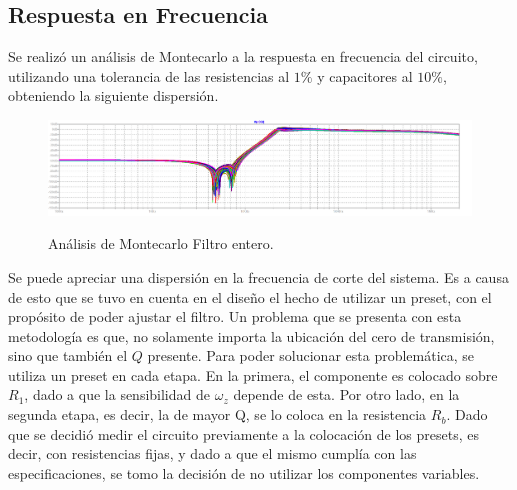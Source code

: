 \subsection{Respuesta en Frecuencia}
Se realizó un análisis de Montecarlo a la respuesta en frecuencia del circuito, utilizando una tolerancia de las resistencias al $1\%$ y capacitores al $10\%$, obteniendo la siguiente dispersión.
\begin{figure}[H]
	\centering
	\includegraphics[width=\textwidth]{Imagenes-Ej3/mcsedra.png}
	\label{fig:mcsedra}
	\caption{Análisis de Montecarlo Filtro entero.}
\end{figure}
Se puede apreciar una dispersión en la frecuencia de corte del sistema. Es a causa de esto que se tuvo en cuenta en el diseño el hecho de utilizar un preset, con el propósito de poder ajustar el filtro. Un problema que se presenta con esta metodología es que, no solamente importa la ubicación del cero de transmisión, sino que también el $Q$ presente. Para poder solucionar esta problemática, se utiliza un preset en cada etapa. En la primera, el componente es colocado sobre $R_1$, dado a que la sensibilidad de $\omega_z$ depende de esta. Por otro lado, en la segunda etapa, es decir, la de mayor Q, se lo coloca en la resistencia $R_b$. Dado que se decidió medir el circuito previamente a la colocación de los presets, es decir, con resistencias fijas, y dado a que el mismo cumplía con las especificaciones, se tomo la decisión de no utilizar los componentes variables.
 
